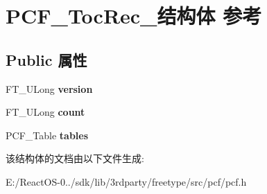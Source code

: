 \hypertarget{struct_p_c_f___toc_rec__}{}\section{P\+C\+F\+\_\+\+Toc\+Rec\+\_\+结构体 参考}
\label{struct_p_c_f___toc_rec__}
\subsection*{Public 属性}
\begin{DoxyCompactItemize}
\item 
\mbox{\label{struct_p_c_f___toc_rec___a9fefff153035611d6f1cb379859d84e7}} 
F\+T\+\_\+\+U\+Long {\bfseries version}
\item 
\mbox{\label{struct_p_c_f___toc_rec___aa554adf7485a87f284b1ef39894e23fd}} 
F\+T\+\_\+\+U\+Long {\bfseries count}
\item 
\mbox{\label{struct_p_c_f___toc_rec___a29dabfeb5edce56ffb4ca3b662d13a42}} 
P\+C\+F\+\_\+\+Table {\bfseries tables}
\end{DoxyCompactItemize}


该结构体的文档由以下文件生成\+:\begin{DoxyCompactItemize}
\item 
E\+:/\+React\+O\+S-\/0../sdk/lib/3rdparty/freetype/src/pcf/pcf.\+h\end{DoxyCompactItemize}
